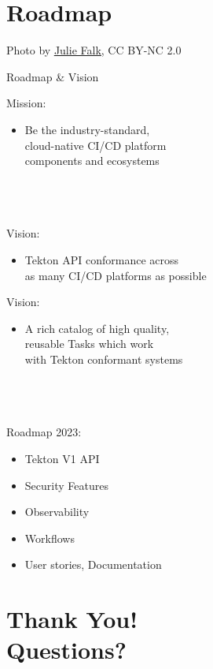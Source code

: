 \documentclass[aspectratio=169,11pt,hyperref={colorlinks=true}]{beamer}
\begin{document}
\section[Roadmap]{Roadmap \faRobot\faCat}
\begin{sectionwithpicrx}{Photo by \href{https://www.flickr.com/photos/piper/}{\underline{Julie Falk}}, CC BY-NC 2.0}
\end{sectionwithpicrx}


\begin{2columnsframe}{Roadmap \& Vision}%
  {%
  Mission:
  \begin{itemize}
    \item Be the industry-standard,\\
          cloud-native CI/CD platform \\
          components and ecosystems \\
  \end{itemize}
  ~\\
  ~\\
  \tiny~\\
  \normalsize
  Vision:
  \begin{itemize}
    \item Tekton API conformance across\\
          as many CI/CD platforms as possible
  \end{itemize}
  }{%
  Vision:
  \begin{itemize}
    \item A rich catalog of high quality,\\
          reusable Tasks which work\\
          with Tekton conformant systems\\
  \end{itemize}
  ~\\
  ~\\
  \tiny~\\
  \normalsize
  Roadmap 2023:
  \begin{itemize}
    \item Tekton V1 API
    \item Security Features
    \item Observability
    \item Workflows
    \item User stories, Documentation
  \end{itemize}
  }
\end{2columnsframe}

\section[Q\&A]{Thank You! \\Questions?}
\end{document}
